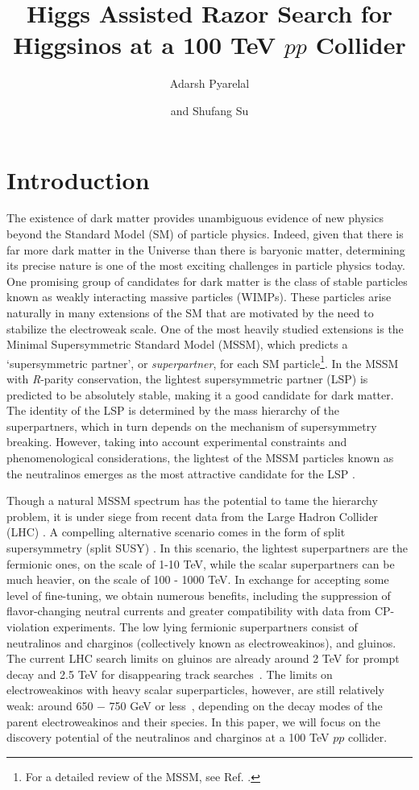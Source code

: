 \documentclass[a4paper,11pt]{article}
\title{Higgs Assisted Razor Search for Higgsinos at a 100 TeV $pp$ Collider}
\author[a]{Adarsh Pyarelal}
\author[b]{and Shufang Su}
\affiliation[a]{School of Information, University of Arizona, Tucson, AZ 85721 , USA}
\affiliation[b]{Department of Physics, University of Arizona, Tucson, AZ 85718, USA}
\begin{document}
\maketitle

\section{Introduction}

The existence of dark matter provides unambiguous evidence of new physics
beyond the Standard Model (SM) of particle physics. Indeed, given that there is
far more dark matter in the Universe than there is baryonic matter, determining
its precise nature is one of the most exciting challenges in particle physics
today.  One promising group of candidates for dark matter is the class of stable
particles known as weakly interacting massive particles (WIMPs). These
particles arise naturally in many extensions of the SM that are motivated by
the need to stabilize the electroweak scale. One of the most heavily studied extensions
is the Minimal Supersymmetric Standard Model (MSSM), which predicts a
`supersymmetric partner', or \emph{superpartner}, for each SM
particle\footnote{For a detailed review of the MSSM, see Ref.
\cite{Martin:1997ns}.}. In the MSSM with \emph{R}-parity conservation, the
lightest supersymmetric partner (LSP) is predicted to be absolutely stable,
making it a good candidate for dark matter. The identity of the LSP is
determined by the mass hierarchy of the superpartners, which in turn depends on
the mechanism of supersymmetry breaking.  However, taking into account experimental
constraints and phenomenological considerations, the lightest of the MSSM
particles known as the neutralinos emerges as the most attractive candidate
for the LSP \cite{Bertone:2004pz}. 

Though a natural MSSM spectrum has the potential to tame the hierarchy problem,
it is under siege from recent data from the Large Hadron Collider (LHC)
\cite{Aaboud:2018ujj, Sirunyan:2018vjp}.  A compelling alternative scenario
comes in the form of split supersymmetry (split SUSY) \cite{Wells:2003tf,
ArkaniHamed:2004yi, Giudice:2004tc}. In this scenario, the lightest
superpartners are the fermionic ones, on the scale of 1-10 TeV, while the
scalar superpartners can be much heavier, on the scale of 100 - 1000 TeV. In
exchange for accepting some level of fine-tuning, we obtain numerous benefits,
including the suppression of flavor-changing neutral currents and greater
compatibility with data from CP-violation experiments.  The low lying fermionic
superpartners consist of neutralinos and charginos (collectively known as
electroweakinos), and gluinos. The current LHC search limits on gluinos are
already around 2 TeV for prompt decay and 2.5 TeV for disappearing track
searches~\cite{CMS-PAS-SUS-19-005}.   The limits on electroweakinos with heavy
scalar superparticles, however, are still relatively weak: around 650 $-$ 750
GeV or less~\cite{ATL-PHYS-PUB-2019-022, Sirunyan:2017lae, Aaboud:2018htj,
Sirunyan:2018ubx, Aaboud:2018zeb}, depending on the decay modes of the parent
electroweakinos and their species.  In this paper, we will focus on the
discovery potential of the neutralinos and charginos at a 100 TeV $pp$
collider. 
\end{document}

